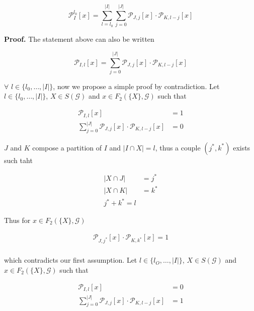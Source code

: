 \documentclass[a4paper, 11pt]{article}
\begin{document}
\begin{equation*}
\mathcal{P}_I^{l_0}\left[ x \right] = \sum_{l=l_0}^{\vert I \vert} \sum_{j=0}^{\vert J \vert} \mathcal{P}_{J, j}\left[ x \right]  \cdot \mathcal{P}_{K, l - j}\left[ x \right] 
\end{equation*} 

\textbf{Proof.} The statement above can also be written

\begin{equation*}
\mathcal{P}_{I,l} \left[ x \right] = \sum_{j=0}^{\vert J \vert} \mathcal{P}_{J, j}\left[ x \right]  \cdot \mathcal{P}_{K, l - j}\left[ x \right] 
\end{equation*} 

$\forall$ $l\in \{l_0, \ldots, \vert I\vert\}$, now we propose a simple proof by contradiction. Let $l\in \{l_0, \ldots, \vert I\vert\}$, $X \in S(\mathcal{G})$ and $x \in F_2(\{X\}, \mathcal{G})$ such that

\begin{align*}
\mathcal{P}_{I,l} \left[ x \right] &= 1\\
\sum_{j=0}^{\vert J \vert} \mathcal{P}_{J, j}\left[ x \right]  \cdot \mathcal{P}_{K, l - j}\left[ x \right] &= 0
\end{align*}

$J$ and $K$ compose a partition of $I$ and $\vert I \cap X \vert = l$, thus a couple $(j^{*}, k^{*})$ exists such taht

\begin{align*}
\vert X \cap J \vert &= j^{*}\\
\vert X \cap K \vert &= k^{*}\\
j^{*} + k^{*} = l
\end{align*}

Thus for $x \in  F_2(\{ X \}, \mathcal{G})$ 

\begin{align*}
\mathcal{P}_{J, j^{*}}\left[ x \right] \cdot \mathcal{P}_{K, k^{*}}\left[ x \right] = 1\\
\end{align*}

which contradicts our first assumption. Let $l \in \{l_O, \ldots, \vert I \vert\}$, $X \in S(\mathcal{G})$ and $x \in F_2(\{X\}, \mathcal{G})$ such that

\begin{align*}
\mathcal{P}_{I,l} \left[ x \right] &= 0\\
\sum_{j=0}^{\vert J \vert} \mathcal{P}_{J, j}\left[ x \right]  \cdot \mathcal{P}_{K, l - j}\left[ x \right] &= 1
\end{align*}
\end{document}
